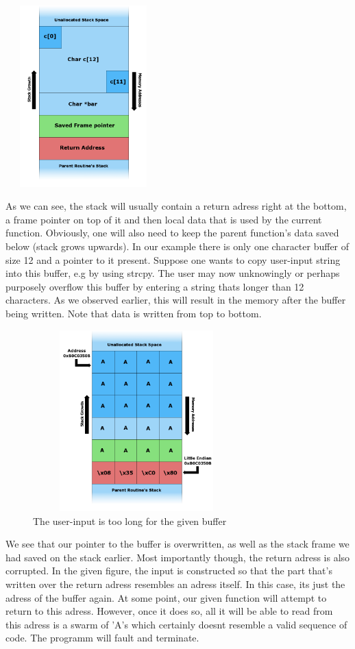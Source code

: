 \documentclass[10pt,twocolumn,a4paper]{article}
\begin{document}
\begin{center}
	\includegraphics[height=7cm,width=6cm]{fig/Stack_Overflow}
\end{center}
As we can see, the stack will usually contain a return adress right at the bottom, a frame pointer on top of it and then local data that is used by the current function. Obviously, one will also need to keep the parent function's data saved below (stack grows upwards).
In our example there is only one character buffer of size 12 and a pointer to it present.
\newpage Suppose one wants to copy user-input string into this buffer, e.g by using strcpy.
The user may now unknowingly or perhaps purposely overflow this buffer by entering a string thats longer than 12 characters.
As we observed earlier, this will result in the memory after the buffer being written. Note that data is written from top to bottom.
\begin{center}
	\begin{figure}[htbp]
		\includegraphics[height=7cm,width=8cm]{fig/Stack_Overflow2}
		\caption{The user-input is too long for the given buffer}
	\end{figure}
\end{center}
We see that our pointer to the buffer is overwritten, as well as the stack frame we had saved on the stack earlier. Most importantly though, the return adress is also corrupted.
In the given figure, the input is constructed so that the part that's written over the return adress resembles an adress itself. In this case, its just the adress of the buffer again.
At some point, our given function will attempt to return to this adress. However, once it does so, all it will be able to read from this adress is a swarm of  'A's which certainly doesnt resemble a valid sequence of code. The programm will fault and terminate.
\end{document}
